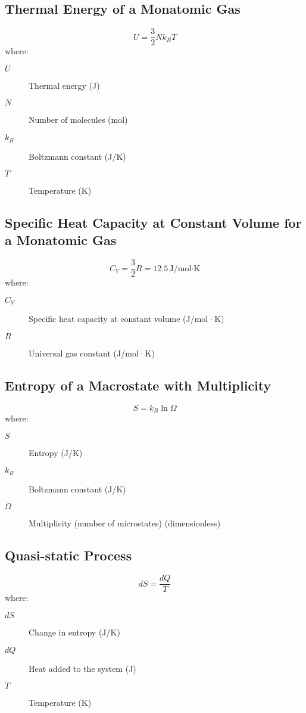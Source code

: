 \documentclass{article}
\begin{document}
\subsection*{Thermal Energy of a Monatomic Gas}
\begin{equation}
U = \frac{3}{2} Nk_B T
\end{equation}
where:
\begin{description}
    \item[$U$] Thermal energy (J)
    \item[$N$] Number of molecules (mol)
    \item[$k_B$] Boltzmann constant (J/K)
    \item[$T$] Temperature (K)
\end{description}

\subsection*{Specific Heat Capacity at Constant Volume for a Monatomic Gas}
\begin{equation}
C_V = \frac{3}{2}R = 12.5 \, \text{J/mol·K}
\end{equation}
where:
\begin{description}
    \item[$C_V$] Specific heat capacity at constant volume (J/mol·K)
    \item[$R$] Universal gas constant (J/mol·K)
\end{description}

\subsection*{Entropy of a Macrostate with Multiplicity}
\begin{equation}
S = k_B \ln \Omega
\end{equation}
where:
\begin{description}
    \item[$S$] Entropy (J/K)
    \item[$k_B$] Boltzmann constant (J/K)
    \item[$\Omega$] Multiplicity (number of microstates) (dimensionless)
\end{description}

\subsection*{Quasi-static Process}
\begin{equation}
dS = \frac{dQ}{T}
\end{equation}
where:
\begin{description}
    \item[$dS$] Change in entropy (J/K)
    \item[$dQ$] Heat added to the system (J)
    \item[$T$] Temperature (K)
\end{description}
\end{document}
